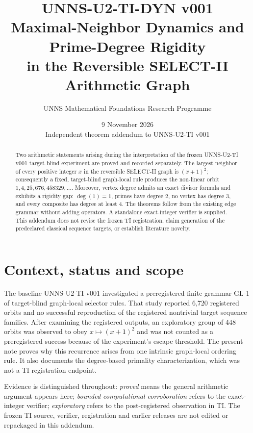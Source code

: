 \documentclass[11pt,a4paper]{article}
\title{\textbf{UNNS-U2-TI-DYN v001}\\[4pt]\large Maximal-Neighbor Dynamics and Prime-Degree Rigidity\\in the Reversible SELECT-II Arithmetic Graph}
\author{UNNS Mathematical Foundations Research Programme}
\date{9 November 2026\\\small Independent theorem addendum to UNNS-U2-TI v001}
\begin{document}
\maketitle
\begin{abstract}
Two arithmetic statements arising during the interpretation of the frozen UNNS-U2-TI v001 target-blind experiment are proved and recorded separately. The largest neighbor of every positive integer $x$ in the reversible SELECT-II graph is $(x+1)^2$; consequently a fixed, target-blind graph-local rule produces the non-linear orbit $1,4,25,676,458329,\ldots$. Moreover, vertex degree admits an exact divisor formula and exhibits a rigidity gap: $\deg(1)=1$, primes have degree $2$, no vertex has degree $3$, and every composite has degree at least $4$. The theorems follow from the existing edge grammar without adding operators. A standalone exact-integer verifier is supplied. This addendum does not revise the frozen TI registration, claim generation of the predeclared classical sequence targets, or establish literature novelty.
\end{abstract}

\section{Context, status and scope}
The baseline UNNS-U2-TI v001 investigated a preregistered finite grammar GL-1 of target-blind graph-local selector rules. That study reported 6,720 registered orbits and no successful reproduction of the registered nontrivial target sequence families. After examining the registered outputs, an exploratory group of 448 orbits was observed to obey $x\mapsto(x+1)^2$ and was not counted as a preregistered success because of the experiment's escape threshold. The present note proves why this recurrence arises from one intrinsic graph-local ordering rule. It also documents the degree-based primality characterization, which was not a TI registration endpoint.

Evidence is distinguished throughout: \emph{proved} means the general arithmetic argument appears here; \emph{bounded computational corroboration} refers to the exact-integer verifier; \emph{exploratory} refers to the post-registered observation in TI. The frozen TI source, verifier, registration and earlier releases are not edited or repackaged in this addendum.
\end{document}
